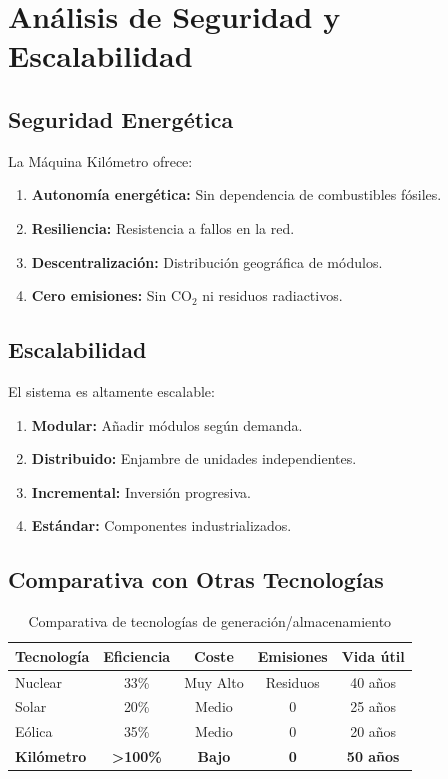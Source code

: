 \documentclass[12pt,a4paper]{article}
\begin{document}
\section{Análisis de Seguridad y Escalabilidad}

\subsection{Seguridad Energética}

La Máquina Kilómetro ofrece:

\begin{enumerate}
    \item \textbf{Autonomía energética:} Sin dependencia de combustibles fósiles.
    \item \textbf{Resiliencia:} Resistencia a fallos en la red.
    \item \textbf{Descentralización:} Distribución geográfica de módulos.
    \item \textbf{Cero emisiones:} Sin CO$_2$ ni residuos radiactivos.
\end{enumerate}

\subsection{Escalabilidad}

El sistema es altamente escalable:

\begin{enumerate}
    \item \textbf{Modular:} Añadir módulos según demanda.
    \item \textbf{Distribuido:} Enjambre de unidades independientes.
    \item \textbf{Incremental:} Inversión progresiva.
    \item \textbf{Estándar:} Componentes industrializados.
\end{enumerate}

\subsection{Comparativa con Otras Tecnologías}

\begin{table}[H]
\centering
\caption{Comparativa de tecnologías de generación/almacenamiento}
\label{tab:comparativa}
\begin{tabular}{@{}lcccc@{}}
\toprule
\textbf{Tecnología} & \textbf{Eficiencia} & \textbf{Coste} & \textbf{Emisiones} & \textbf{Vida útil} \\
\midrule
Nuclear & 33\% & Muy Alto & Residuos & 40 años \\
Solar & 20\% & Medio & 0 & 25 años \\
Eólica & 35\% & Medio & 0 & 20 años \\
\textbf{Kilómetro} & \textbf{>100\%} & \textbf{Bajo} & \textbf{0} & \textbf{50 años} \\
\bottomrule
\end{tabular}
\end{table}
\end{document}
